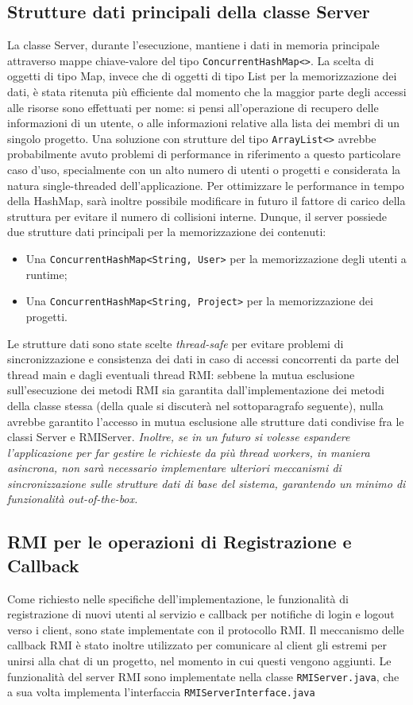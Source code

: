 \documentclass{article}
\begin{document}
\subsection{Strutture dati principali della classe Server}
\label{strutture_dati_server}
La classe Server, durante l'esecuzione, mantiene i dati in memoria principale attraverso mappe chiave-valore del tipo \texttt{ConcurrentHashMap<>}. La scelta di oggetti di tipo Map, invece che di oggetti di tipo List per la memorizzazione dei dati, è stata ritenuta più efficiente dal momento che la maggior parte degli accessi alle risorse sono effettuati per nome: si pensi all'operazione di recupero delle informazioni di un utente, o alle informazioni relative alla lista dei membri di un singolo progetto. Una soluzione con strutture del tipo \texttt{ArrayList<>} avrebbe probabilmente avuto problemi di performance in riferimento a questo particolare caso d'uso, specialmente con un alto numero di utenti o progetti e considerata la natura single-threaded dell'applicazione. Per ottimizzare le performance in tempo della HashMap, sarà inoltre possibile modificare in futuro il fattore di carico della struttura per evitare il numero di collisioni interne.
Dunque, il server possiede due strutture dati principali per la memorizzazione dei contenuti:
\begin{itemize}
    \item Una \texttt{ConcurrentHashMap<String, User>} per la memorizzazione degli utenti a runtime;
    \item Una \texttt{ConcurrentHashMap<String, Project>} per la memorizzazione dei progetti.
\end{itemize}
Le strutture dati sono state scelte \emph{thread-safe} per evitare problemi di sincronizzazione e consistenza dei dati in caso di accessi concorrenti da parte del thread main e dagli eventuali thread RMI: sebbene la mutua esclusione sull'esecuzione dei metodi RMI sia garantita dall'implementazione dei metodi della classe stessa (della quale si discuterà nel sottoparagrafo seguente), nulla avrebbe garantito l'accesso in mutua esclusione alle strutture dati condivise fra le classi Server e RMIServer.
\emph{Inoltre, se in un futuro si volesse espandere l'applicazione per far gestire le richieste da più thread workers, in maniera asincrona, non sarà necessario implementare ulteriori meccanismi di sincronizzazione sulle strutture dati di base del sistema, garantendo un minimo di funzionalità out-of-the-box.}

\subsection{RMI per le operazioni di Registrazione e Callback}
Come richiesto nelle specifiche dell'implementazione, le funzionalità di registrazione di nuovi utenti al servizio e callback per notifiche di login e logout verso i client, sono state implementate con il protocollo RMI. Il meccanismo delle callback RMI è stato inoltre utilizzato per comunicare al client gli estremi per unirsi alla chat di un progetto, nel momento in cui questi vengono aggiunti. Le funzionalità del server RMI sono implementate nella classe \texttt{RMIServer.java}, che a sua volta implementa l'interfaccia \texttt{RMIServerInterface.java}
\end{document}
